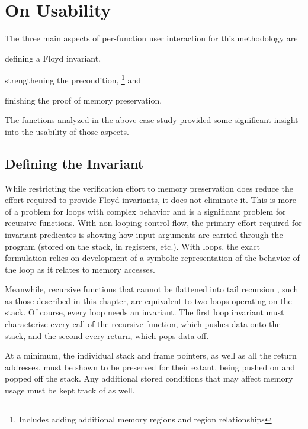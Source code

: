 \section{On Usability}\label{se:usability}
The three main aspects of per-function user interaction for this methodology are
\begin{enumerate*}
  \item defining a Floyd invariant,
  \item strengthening the precondition,%
    \footnote{Includes adding additional memory regions and region relationships} and
  \item finishing the proof of memory preservation.
\end{enumerate*}
The functions analyzed in the above case study provided some significant insight
into the usability of those aspects.

\subsection{Defining the Invariant}
While restricting the verification effort to memory preservation
does reduce the effort required to provide Floyd invariants, it does not eliminate it.
This is more of a problem for loops with complex behavior
and is a significant problem for recursive functions.
With non-looping control flow,
the primary effort required for invariant predicates is showing how input arguments
are carried through the program (stored on the stack, in registers, etc.).%
%
With loops, the exact formulation relies on development of a symbolic representation
of the behavior of the loop as it relates to memory accesses.

Meanwhile, recursive functions that cannot be flattened into tail recursion \autocite{probst2001proper},
such as those described in this chapter,
are equivalent to two loops operating on the stack.
Of course, every loop needs an invariant.
The first loop invariant must characterize every call of the recursive function,
which pushes data onto the stack, and the second every return, which pops data off.

At a minimum, the individual stack and frame pointers,
as well as all the return addresses, must be shown to
be preserved for their extant,%
%
%
being pushed on and popped off the stack.
Any additional stored conditions
that may affect memory usage must be kept track of as well.

